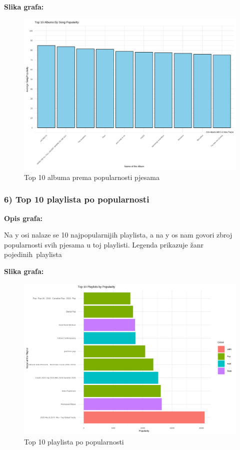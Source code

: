 	\textbf{Slika grafa:}
	\begin{figure}[H]
		\includegraphics[scale=0.9]{slike/albums_by_song_popularity.png}
		\centering
		\caption{Top 10 albuma prema popularnosti pjesama}
		
	\end{figure}
	
	\subsubsection{6) Top 10 playlista po popularnosti}
	
	\textbf{Opis grafa:}
	
	Na y osi nalaze se 10 najpopularnijih playlista, a na y os nam govori zbroj popularnosti svih pjesama u toj playlisti. Legenda prikazuje žanr pojedinih playlista 
	
	\textbf{Slika grafa:}
	\begin{figure}[H]
		\includegraphics[scale=0.9]{slike/playlists_by_popularity.png}
		\centering
		\caption{Top 10 playlista po popularnosti}
		
	\end{figure}
	
